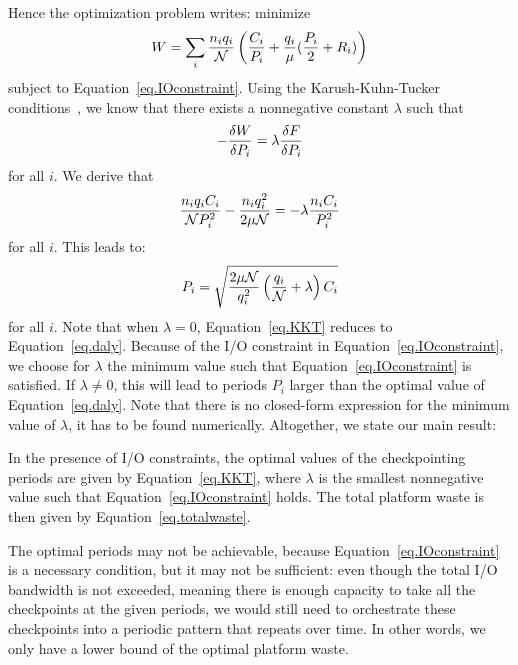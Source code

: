 Hence the optimization problem writes: minimize
\begin{equation}
W = \sum_i \frac{n_{i} q_{i}}{{\mathcal N}}  \left( \frac{C_{i}}{P_{i}} +
\frac{q_{i}}{\mu}(\frac{P_{i}}{2} + R_{i}) \right)
\label{eq.totalwaste}
\end{equation}
subject to Equation~\eqref{eq.IOconstraint}.
Using the Karush-Kuhn-Tucker conditions~\cite{Boyd2004}, we know that there exists a nonnegative constant
$\lambda$
such that
$$- \frac{\delta W}{\delta P_{i}} = \lambda \frac{\delta F}{\delta P_{i}}$$
for all $i$. We derive that
$$\frac{n_{i} q_{i} C_{i}}{{\mathcal N} P_{i}^{2}} -    \frac{n_{i} q_{i}^{2}}{2 \mu {\mathcal N}} = - \lambda \frac{n_{i} C_{i}}{P_{i}^{2}}
$$
for all $i$. This leads to:
 \begin{equation}
P_{i} = \sqrt{\frac{2 \mu  {\mathcal N}}{q_{i}^{2}} \left(\frac{q_{i}}{{\mathcal N}} +\lambda \right) C_{i}}
  \label{eq.KKT}
\end{equation}
for all $i$. Note that when $\lambda=0$, Equation~\eqref{eq.KKT} reduces to Equation~\eqref{eq.daly}.
Because of the I/O constraint in Equation~\eqref{eq.IOconstraint},
we choose for $\lambda$ the minimum value such that Equation~\eqref{eq.IOconstraint}
  is satisfied. If $\lambda \neq 0$, this will lead to periods $P_{i}$ larger
  than the optimal value of Equation~\eqref{eq.daly}. Note that there is no
  closed-form expression for the minimum value of $\lambda$,
  it has to be found numerically.
   Altogether, we state our main result:

   \begin{theorem}
  In the presence of I/O constraints, the optimal values of the checkpointing periods are given
  by Equation~\eqref{eq.KKT}, where $\lambda$ is the smallest nonnegative value such that
  Equation~\eqref{eq.IOconstraint} holds. The total platform waste is then given by
  Equation~\eqref{eq.totalwaste}.
\end{theorem}

The optimal periods may not be achievable, because Equation~\eqref{eq.IOconstraint} is a
necessary condition, but it may not be sufficient:
even though the total I/O bandwidth is not exceeded, meaning there is enough
capacity to take all the checkpoints at the given periods, we would still need to 
orchestrate these checkpoints into a periodic pattern that repeats over time.
In other words, we only have a lower bound of the optimal platform waste.

